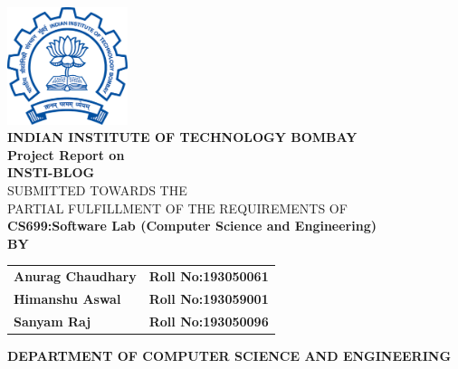 \documentclass[oneside,a4paper,12pt]{article}
\begin{document}
\setlength{\parindent}{0mm}
\begin{center}
\includegraphics[width=100pt]{IIT_Bombay_color_logo.png} \\
\vspace{20pt}
{\bfseries INDIAN INSTITUTE OF TECHNOLOGY BOMBAY \\}
 \vspace*{2\baselineskip}
{\bfseries Project Report on \\}
 \vspace*{1\baselineskip}
{\bfseries \fontsize{16}{12} \selectfont  INSTI-BLOG \\ \vspace*{2\baselineskip}}
{\fontsize{12}{12} \selectfont SUBMITTED TOWARDS THE
 \\PARTIAL FULFILLMENT OF THE REQUIREMENTS OF \\

\vspace*{2\baselineskip}}
{\bfseries \fontsize{14}{12} \selectfont CS699:Software Lab (Computer Science and
Engineering) \\
\vspace*{1\baselineskip}} 
{\bfseries \fontsize{14}{12} \selectfont BY \\ 
\vspace*{1\baselineskip}} 

\begin{tabular}{l l}
\bfseries{Anurag Chaudhary}     &  \hspace{10mm}\bfseries{Roll No:193050061}\\
\bfseries{Himanshu Aswal}     &  \hspace{10mm}\bfseries{Roll No:193059001}\\
\bfseries{Sanyam Raj}     &  \hspace{10mm}\bfseries{Roll No:193050096}\\



\end{tabular}

\vspace*{2\baselineskip}
\vspace{20pt}

{\bfseries \fontsize{14}{12} \selectfont DEPARTMENT OF COMPUTER SCIENCE AND ENGINEERING \\
\vspace{20pt}}

\end{center}
\end{document}
